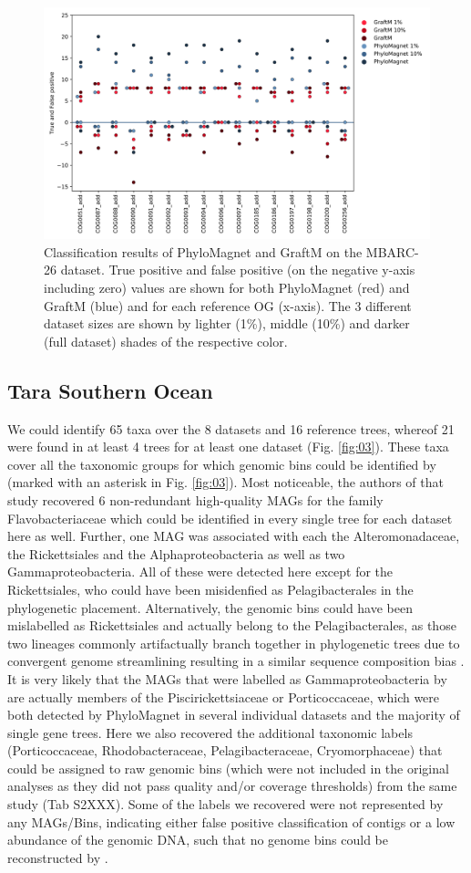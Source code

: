 \documentclass{bioinfo}
\begin{document}
\begin{figure}[!tpb]%
\centerline{\includegraphics[width=.45\textwidth]{figures/Fig2.png}}
\caption{Classification results of PhyloMagnet and GraftM on the MBARC-26 dataset. True positive and false positive (on the negative y-axis including zero) values are shown for both PhyloMagnet (red) and GraftM (blue) and for each reference OG (x-axis). The 3 different dataset sizes are shown by lighter (1\%), middle (10\%) and darker (full dataset) shades of the respective color.} \label{fig:02}
\end{figure}

\subsection{Tara Southern Ocean}
We could identify 65 taxa over the 8 datasets and 16 reference trees, whereof 21 were found in at least 4 trees for at least one dataset (Fig. \ref{fig:03}). These taxa cover all the taxonomic groups for which genomic bins could be identified by \citet{Delmont2018} (marked with an asterisk in Fig. \ref{fig:03}). Most noticeable, the authors of that study recovered 6 non-redundant high-quality MAGs for the family Flavobacteriaceae which could be identified in every single tree for each dataset here as well. Further, one MAG was associated with each the Alteromonadaceae, the Rickettsiales and the Alphaproteobacteria as well as two Gammaproteobacteria. All of these were detected here except for the Rickettsiales, who could have been misidenfied as Pelagibacterales in the phylogenetic placement. Alternatively, the genomic bins could have been mislabelled as Rickettsiales and actually belong to the Pelagibacterales, as those two lineages commonly artifactually branch together in phylogenetic trees due to convergent genome streamlining resulting in a similar sequence composition bias \citep{Roger2017,Martijn2018,Rodriguez-Ezpeleta2012,Viklund2013}. It is very likely that the MAGs that were labelled as Gammaproteobacteria by \citet{Delmont2018} are actually members of the Piscirickettsiaceae or Porticoccaceae, which were both detected by PhyloMagnet in several individual datasets and the majority of single gene trees. Here we also recovered the additional taxonomic labels (Porticoccaceae, Rhodobacteraceae, Pelagibacteraceae, Cryomorphaceae) that could be assigned to raw genomic bins (which were not included in the original analyses as they did not pass quality and/or coverage thresholds) from the same study (Tab S2XXX). Some of the labels we recovered were not represented by any MAGs/Bins, indicating either false positive classification of contigs or a low abundance of the genomic DNA, such that no genome bins could be reconstructed by \citet{Delmont2018}.
\end{document}
